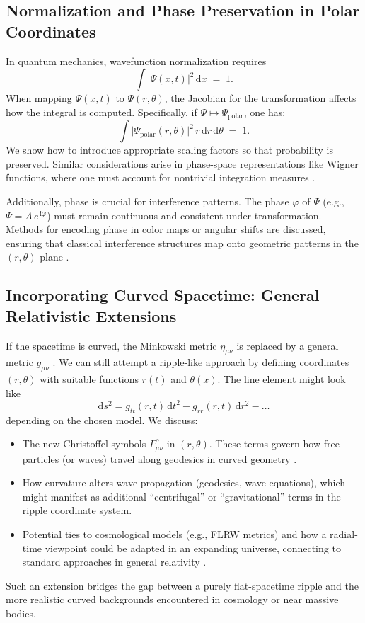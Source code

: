 \documentclass{article}
\begin{document}
\subsection{Normalization and Phase Preservation in Polar Coordinates}
\label{subsec:normalization}
In quantum mechanics, wavefunction normalization requires 
\cite{griffiths2005introduction, feynmanlectures}
\[
  \int \lvert \Psi(x,t) \rvert^2 \,\mathrm{d}x \;=\; 1.
\]
When mapping \(\Psi(x,t)\) to \(\Psi(r,\theta)\), the Jacobian for 
the transformation affects how the integral is computed. Specifically, 
if \(\Psi\mapsto\Psi_{\mathrm{polar}}\), one has:
\[
  \int \lvert \Psi_{\mathrm{polar}}(r,\theta) \rvert^2 \, r \,\mathrm{d}r \,\mathrm{d}\theta 
  \;=\; 1.
\]
We show how to introduce appropriate scaling factors so that probability 
is preserved. Similar considerations arise in phase-space representations 
like Wigner functions, where one must account for nontrivial integration 
measures \cite{wigner1932, husimi1940some}.

Additionally, phase is crucial for interference patterns. The phase 
\(\varphi\) of \(\Psi\) (e.g., \(\Psi = A \, e^{\,\mathrm{i}\varphi}\)) 
must remain continuous and consistent under transformation. Methods for 
encoding phase in color maps or angular shifts are discussed, ensuring 
that classical interference structures map onto geometric patterns in the 
\((r,\theta)\) plane \cite{schleich2001quantum, glauber1963}.

\subsection{Incorporating Curved Spacetime: General Relativistic Extensions}
\label{subsec:curved-spacetime}
If the spacetime is curved, the Minkowski metric \(\eta_{\mu\nu}\) is 
replaced by a general metric \(g_{\mu\nu}\) \cite{misner1973, penrose2004}. 
We can still attempt a ripple-like approach by defining coordinates 
\((r,\theta)\) with suitable functions \(r(t)\) and \(\theta(x)\). The 
line element might look like
\[
  \mathrm{d}s^2 = g_{tt}(r,t)\,\mathrm{d}t^2 - g_{rr}(r,t)\,\mathrm{d}r^2 - \dots
\]
depending on the chosen model. We discuss:
\begin{itemize}
  \item The new Christoffel symbols \(\Gamma^\rho_{\mu\nu}\) in \((r,\theta)\). 
        These terms govern how free particles (or waves) travel along geodesics 
        in curved geometry \cite{rindler1977essential}.
  \item How curvature alters wave propagation (geodesics, wave equations), 
        which might manifest as additional “centrifugal” or “gravitational” 
        terms in the ripple coordinate system.
  \item Potential ties to cosmological models (e.g., FLRW metrics) and 
        how a radial-time viewpoint could be adapted in an expanding universe, 
        connecting to standard approaches in general relativity 
        \cite{hawking1988, susskind2008}.
\end{itemize}
Such an extension bridges the gap between a purely flat-spacetime ripple 
and the more realistic curved backgrounds encountered in cosmology 
or near massive bodies.
\end{document}
